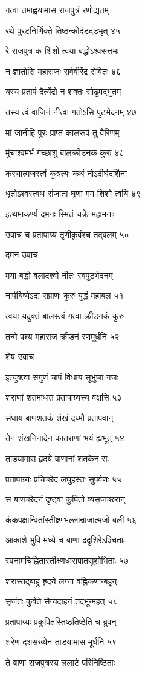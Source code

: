 गत्वा तमाह्वयामास राजपुत्रं रणोद्यतम्

रथे पुरटनिर्णिक्ते तिष्ठन्कोदंडदंडभृत् ४५

रे राजपुत्र क शिशो त्वया बद्धोऽश्वसत्तमः

न ज्ञातोसि महाराजः सर्ववीरेंद्र सेवितः ४६

यस्य प्रतापं दैत्येंद्रो न शक्तः सोढुमद्भुतम्

तस्य त्वं वाजिनं नीत्वा गतोऽसि पुटभेदनम् ४७

मां जानीहि पुरः प्राप्तं कालरूपं तु वैरिणम्

मुंचाश्वमर्भ गच्छाशु बालक्रीडनकं कुरु ४८

कस्यात्मजस्त्वं कुत्रत्यः कथं नोऽदीर्घदर्शिना

धृतोऽश्वस्त्वथ संजाता घृणा मम शिशो त्वयि ४९

इत्थमाकर्ण्य दमनः स्मितं चक्रे महामनाः

उवाच च प्रतापाग्र्यं तृणीकुर्वंश्च तद्बलम् ५०

दमन उवाच

मया बद्धो बलादश्वो नीतः स्वपुटभेदनम्

नार्पयिष्येऽद्य सप्राणः कुरु युद्धं महाबल ५१

त्वया यदुक्तं बालस्त्वं गत्वा क्रीडनकं कुरु

तन्मे पश्य महाराज क्रीडनं रणमूर्धनि ५२

शेष उवाच

इत्युक्त्वा सगुणं चापं विधाय सुभुजां गजः

शराणां शतमाधत्त प्रतापाग्र्यस्य वक्षसि ५३

संधाय बाणशतकं शंखं दध्मौ प्रतापवान्

तेन शंखनिनादेन कातराणां भयं ह्यभूत् ५४

ताडयामास हृदये बाणानां शतकेन सः

प्रतापाग्र्यः प्रचिच्छेद लघुहस्तः सुपर्वणः ५५

स बाणच्छेदनं दृष्ट्वा कुपितो व्यसृजच्छरान्

कंकपक्षान्वितांस्तीक्ष्णभल्लान्राजात्मजो बली ५६

आकाशे भुवि मध्ये च बाणा ददृशिरेऽञ्चिताः

स्वनामचिह्नितास्तीक्ष्णधारापातसुशोभिताः ५७

शरास्तद्बाहु हृदये लग्ना वह्निकणान्बहून्

सृजंतः कुर्वते सैन्यदाहनं तदभून्महत् ५८

प्रतापाग्र्यः प्रकुपितस्तिष्ठतिष्ठेति च ब्रुवन्

शरेण दशसंख्येन ताडयामास मूर्धनि ५९

ते बाणा राजपुत्रस्य ललाटे परिनिष्ठिताः

